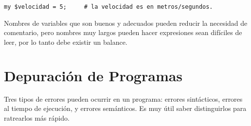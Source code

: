 \begin{verbatim}
my $velocidad = 5;     # la velocidad es en metros/segundos. 
\end{verbatim}
%
Nombres de variables que son buenos y adecuados pueden reducir la necesidad 
de comentario, pero nombres muy largos pueden hacer expresiones sean difíciles
de leer, por lo tanto debe existir un balance.


\section{Depuración de Programas}

Tres tipos de errores pueden ocurrir en un programa: errores
sintácticos, errores al tiempo de ejecución, y  errores semánticos.
Es muy útil saber distinguirlos para ratrearlos más rápido.

